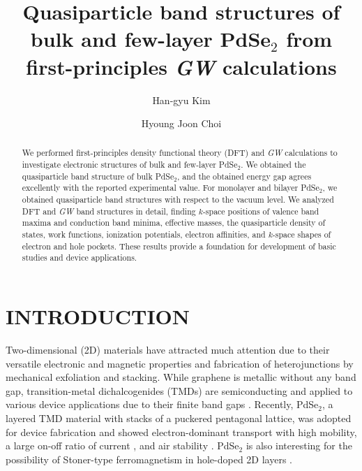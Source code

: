 \documentclass[aps,prb,longbibliography,twocolumn]{revtex4-2}
\begin{document}
\title{Quasiparticle band structures of bulk and few-layer PdSe$_2$ from first-principles {\em GW} calculations}
\author{Han-gyu Kim}
\author{Hyoung Joon Choi}

\begin{abstract}
We performed first-principles density functional theory (DFT) and {\em GW} calculations
to investigate electronic structures of bulk and few-layer PdSe$_2$.
We obtained the quasiparticle band structure of bulk PdSe$_2$, and the obtained energy gap agrees excellently with the reported experimental value. 
For monolayer and bilayer PdSe$_2$, we obtained quasiparticle band structures with respect to the vacuum level.
We analyzed DFT and {\em GW} band structures in detail, finding
$k$-space positions of valence band maxima and conduction band minima,
effective masses, the quasiparticle density of states, work functions, ionization potentials, electron affinities, and $k$-space shapes of electron and hole pockets.
These results provide a foundation for development of basic studies and device applications.
\end{abstract}


\maketitle


\section{\label{sec:sec1}INTRODUCTION}

Two-dimensional (2D) materials have attracted much attention due 
to their 
versatile electronic and magnetic properties and fabrication of heterojunctions
by mechanical exfoliation and stacking. 
While graphene is metallic without any band gap, 
transition-metal dichalcogenides (TMDs) are semiconducting and applied to various device applications due to their finite band gaps \cite{Mak2010,Splendiani2010,Britnell2013,Zhang2014,Kim2021,Oh2019,Park2015}.
Recently, PdSe$_2$, a layered TMD material with stacks of a puckered pentagonal lattice, 
was adopted for device fabrication and showed 
electron-dominant transport with high mobility, a large on-off ratio of current \cite{Chow2017},
and air stability \cite{Oyedele2017}.
PdSe$_2$ is also interesting for the possibility of Stoner-type ferromagnetism in hole-doped 2D layers \cite{SHZhang2018}.
\end{document}
